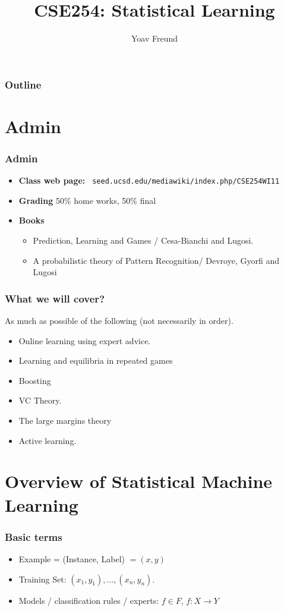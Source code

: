 \documentclass[handout]{beamer}
\title[Introduction] %
{CSE254: Statistical Learning}
\author[Freund] %
{Yoav Freund}
\institute[Universities of Somewhere and Elsewhere] %
\begin{document}
\begin{frame}
  \titlepage
\end{frame}

\begin{frame}
  \frametitle{Outline}
  \tableofcontents
\end{frame}

\section{Admin}
\begin{frame}
\frametitle{Admin}
\begin{itemize}
\item {\bf Class web page:} {\tt
    seed.ucsd.edu/mediawiki/index.php/CSE254WI11}
\item {\bf Grading} 50\% home works, 50\% final
\item {\bf Books} 
\begin{itemize}
\item Prediction, Learning and Games / Cesa-Bianchi and Lugosi.
\item A probabilistic theory of Pattern Recognition/ Devroye, Gyorfi and Lugosi
\end{itemize} 
\end{itemize}
\end{frame}

\begin{frame}
\frametitle{What we will cover?}
As much as possible of the following (not necessarily in order).
\begin{itemize}
\item Online learning using expert advice.
\item Learning and equilibria in repeated games
\item Boosting
\item VC Theory.
\item The large margins theory
\item Active learning.
\end{itemize}
\end{frame}

\section{Overview of Statistical Machine Learning}

\begin{frame}
\frametitle{Basic terms}
\begin{itemize}
\item Example = (Instance, Label) $= (x,y)$
\item Training Set: $(x_1,y_1), \ldots, (x_n,y_n)$.
\item Models / classification rules / experts: $f \in F$, $f:X \to Y$ 
\end{itemize}
\end{frame}
\end{document}

